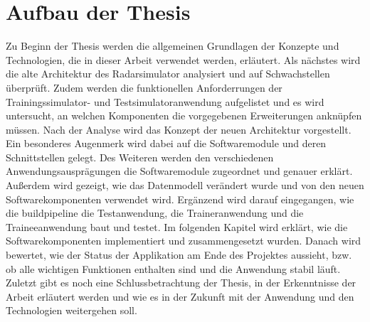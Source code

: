 \newpage

\section{Aufbau der Thesis}
Zu Beginn der Thesis werden die allgemeinen Grundlagen der Konzepte und Technologien, die in dieser Arbeit verwendet werden, erläutert. Als nächstes wird die alte Architektur des Radarsimulator analysiert und auf Schwachstellen überprüft. Zudem werden die funktionellen Anforderrungen der Trainingssimulator- und Testsimulatoranwendung aufgelistet und es wird untersucht, an welchen Komponenten die vorgegebenen Erweiterungen anknüpfen müssen. Nach der Analyse wird das Konzept der neuen Architektur vorgestellt. Ein besonderes Augenmerk wird dabei auf die Softwaremodule und deren Schnittstellen gelegt. Des Weiteren werden den verschiedenen Anwendungsausprägungen die Softwaremodule zugeordnet und genauer erklärt. Außerdem wird gezeigt, wie das Datenmodell verändert wurde und von den neuen Softwarekomponenten verwendet wird. Ergänzend wird darauf eingegangen, wie die \Gls{buildpipeline} die Testanwendung, die Traineranwendung und die Traineeanwendung baut und testet. Im folgenden Kapitel wird erklärt, wie die Softwarekomponenten implementiert und zusammengesetzt wurden. Danach wird bewertet, wie der Status der Applikation am Ende des Projektes aussieht, bzw. ob alle wichtigen Funktionen enthalten sind und die Anwendung stabil läuft. Zuletzt gibt es noch eine Schlussbetrachtung der Thesis, in der Erkenntnisse der Arbeit erläutert werden und wie es in der Zukunft mit der Anwendung und den Technologien weitergehen soll.

